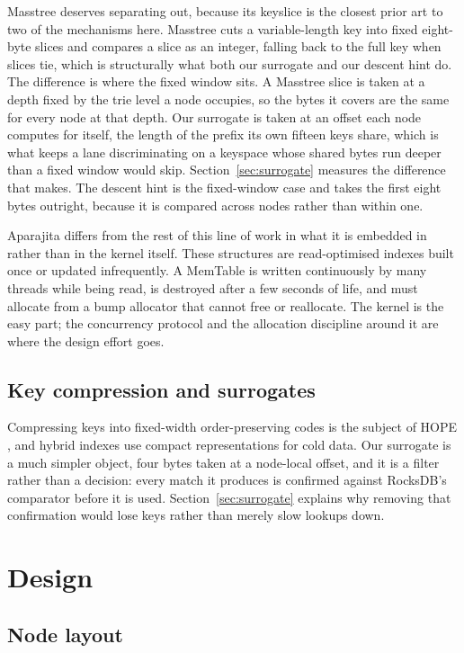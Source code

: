 \documentclass[conference]{IEEEtran}
\begin{document}
Masstree deserves separating out, because its keyslice is the closest prior art to
two of the mechanisms here. Masstree cuts a variable-length key into fixed
eight-byte slices and compares a slice as an integer, falling back to the full key
when slices tie, which is structurally what both our surrogate and our descent hint
do. The difference is where the fixed window sits. A Masstree slice is taken at a
depth fixed by the trie level a node occupies, so the bytes it covers are the same
for every node at that depth. Our surrogate is taken at an offset each node
computes for itself, the length of the prefix its own fifteen keys share, which is
what keeps a lane discriminating on a keyspace whose shared bytes run deeper than
a fixed window would skip. Section~\ref{sec:surrogate} measures the difference that
makes. The descent hint is the fixed-window case and takes the first eight bytes
outright, because it is compared across nodes rather than within one.

Aparajita differs from the rest of this line of work in what it is embedded in
rather than in the kernel itself. These structures are read-optimised indexes built once or
updated infrequently. A MemTable is written continuously by many threads while
being read, is destroyed after a few seconds of life, and must allocate from a
bump allocator that cannot free or reallocate. The kernel is the easy part; the
concurrency protocol and the allocation discipline around it are where the design
effort goes.

\subsection{Key compression and surrogates}

Compressing keys into fixed-width order-preserving codes is the subject of HOPE
\cite{zhang2020hope}, and hybrid indexes \cite{zhang2016hybrid} use compact
representations for cold data. Our surrogate is a much simpler object, four bytes
taken at a node-local offset, and it is a filter rather than a decision: every
match it produces is confirmed against RocksDB's comparator before it is used.
Section~\ref{sec:surrogate} explains why removing that confirmation would lose
keys rather than merely slow lookups down.

\section{Design}

\subsection{Node layout}
\end{document}
